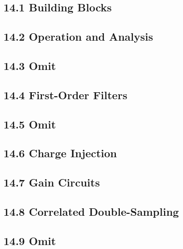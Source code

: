 \subsection{14.1 Building Blocks}
\subsection{14.2 Operation and Analysis}
\subsection{14.3 Omit}
\subsection{14.4 First-Order Filters}
\subsection{14.5 Omit}
\subsection{14.6 Charge Injection}
\subsection{14.7 Gain Circuits}
\subsection{14.8 Correlated Double-Sampling}
\subsection{14.9 Omit}
